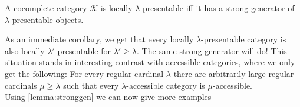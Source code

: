 \begin{Lemma}\label{lemma:stronggen}
A cocomplete category $\mathcal K$ is locally $\lambda$-presentable iff it has a strong generator of $\lambda$-presentable objects. 
\end{Lemma}

As an immediate corollary, we get that every locally $\lambda$-presentable category is also locally $\lambda'$-presentable for $\lambda' \geq \lambda$. The same strong generator will do! This situation stands in interesting contrast with accessible categories, where we only get the following: For every regular cardinal $\lambda$ there are arbitrarily large regular cardinals $\mu \geq \lambda$ such that every $\lambda$-accessible category is $\mu$-accessible. \\

Using \ref{lemma:stronggen} we can now give more examples

